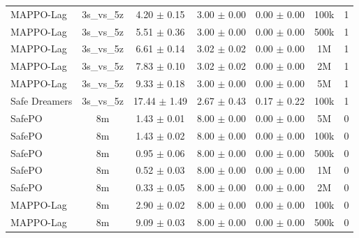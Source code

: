 \documentclass{article}
\begin{document}
\begin{longtable}{lcccccc}
MAPPO-Lag & 3s\_vs\_5z & \textcolor{green!60!black}{4.20 $\pm$ 0.15} & \textcolor{green!60!black}{3.00 $\pm$ 0.00} & \textcolor{green!60!black}{0.00 $\pm$ 0.00} & 100k & 1 \\
MAPPO-Lag & 3s\_vs\_5z & \textcolor{green!60!black}{5.51 $\pm$ 0.36} & \textcolor{green!60!black}{3.00 $\pm$ 0.00} & \textcolor{green!60!black}{0.00 $\pm$ 0.00} & 500k & 1 \\
MAPPO-Lag & 3s\_vs\_5z & \textcolor{green!60!black}{6.61 $\pm$ 0.14} & \textcolor{green!60!black}{3.02 $\pm$ 0.02} & \textcolor{green!60!black}{0.00 $\pm$ 0.00} & 1M & 1 \\
MAPPO-Lag & 3s\_vs\_5z & \textcolor{green!60!black}{7.83 $\pm$ 0.10} & \textcolor{green!60!black}{3.02 $\pm$ 0.02} & \textcolor{green!60!black}{0.00 $\pm$ 0.00} & 2M & 1 \\
MAPPO-Lag & 3s\_vs\_5z & \textcolor{green!60!black}{9.33 $\pm$ 0.18} & \textcolor{green!60!black}{3.00 $\pm$ 0.00} & \textcolor{green!60!black}{0.00 $\pm$ 0.00} & 5M & 1 \\
Safe Dreamers & 3s\_vs\_5z & 17.44 $\pm$ 1.49 & 2.67 $\pm$ 0.43 & 0.17 $\pm$ 0.22 & 100k & 1 \\
\midrule
SafePO & 8m & \textcolor{green!60!black}{1.43 $\pm$ 0.01} & \textcolor{green!60!black}{8.00 $\pm$ 0.00} & \textcolor{green!60!black}{0.00 $\pm$ 0.00} & 5M & 0 \\
SafePO & 8m & \textcolor{green!60!black}{1.43 $\pm$ 0.02} & \textcolor{green!60!black}{8.00 $\pm$ 0.00} & \textcolor{green!60!black}{0.00 $\pm$ 0.00} & 100k & 0 \\
SafePO & 8m & \textcolor{green!60!black}{0.95 $\pm$ 0.06} & \textcolor{green!60!black}{8.00 $\pm$ 0.00} & \textcolor{green!60!black}{0.00 $\pm$ 0.00} & 500k & 0 \\
SafePO & 8m & \textcolor{green!60!black}{0.52 $\pm$ 0.03} & \textcolor{green!60!black}{8.00 $\pm$ 0.00} & \textcolor{green!60!black}{0.00 $\pm$ 0.00} & 1M & 0 \\
SafePO & 8m & \textcolor{green!60!black}{0.33 $\pm$ 0.05} & \textcolor{green!60!black}{8.00 $\pm$ 0.00} & \textcolor{green!60!black}{0.00 $\pm$ 0.00} & 2M & 0 \\
MAPPO-Lag & 8m & \textcolor{green!60!black}{2.90 $\pm$ 0.02} & \textcolor{green!60!black}{8.00 $\pm$ 0.00} & \textcolor{green!60!black}{0.00 $\pm$ 0.00} & 100k & 0 \\
MAPPO-Lag & 8m & \textcolor{green!60!black}{9.09 $\pm$ 0.03} & \textcolor{green!60!black}{8.00 $\pm$ 0.00} & \textcolor{green!60!black}{0.00 $\pm$ 0.00} & 500k & 0 \\

\end{longtable}
\end{document}
